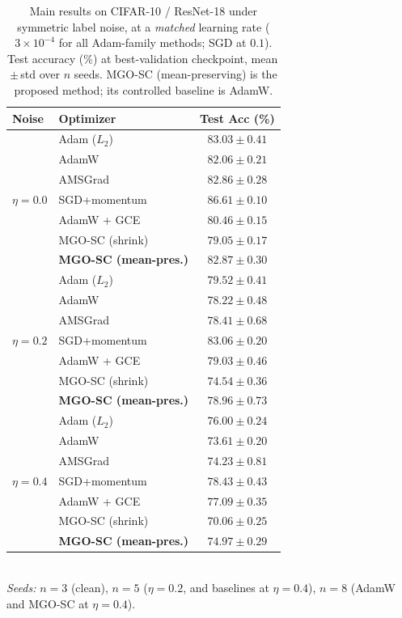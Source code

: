 \begin{table}[!ht]
\centering
\footnotesize
\setlength{\tabcolsep}{5.0pt}
\renewcommand{\arraystretch}{1.15}
\caption{Main results on CIFAR-10 / ResNet-18 under symmetric label noise, at a \emph{matched} learning rate ($3\times10^{-4}$ for all Adam-family methods; SGD at $0.1$). Test accuracy (\%) at best-validation checkpoint, mean\,$\pm$\,std over $n$ seeds. MGO-SC (mean-preserving) is the proposed method; its controlled baseline is AdamW.}
\label{tab:main_results}
\begin{tabular}{llc}
\toprule
\textbf{Noise} & \textbf{Optimizer} & \textbf{Test Acc (\%)} \\
\midrule
\multirow{7}{*}{$\eta=0.0$}
 & Adam ($L_2$)            & $83.03 \pm 0.41$ \\
 & AdamW                   & $82.06 \pm 0.21$ \\
 & AMSGrad                 & $82.86 \pm 0.28$ \\
 & SGD+momentum            & $86.61 \pm 0.10$ \\
 & AdamW + GCE             & $80.46 \pm 0.15$ \\
 & MGO-SC (shrink)         & $79.05 \pm 0.17$ \\
 & \textbf{MGO-SC (mean-pres.)} & $\mathbf{82.87 \pm 0.30}$ \\
\midrule
\multirow{7}{*}{$\eta=0.2$}
 & Adam ($L_2$)            & $79.52 \pm 0.41$ \\
 & AdamW                   & $78.22 \pm 0.48$ \\
 & AMSGrad                 & $78.41 \pm 0.68$ \\
 & SGD+momentum            & $83.06 \pm 0.20$ \\
 & AdamW + GCE             & $79.03 \pm 0.46$ \\
 & MGO-SC (shrink)         & $74.54 \pm 0.36$ \\
 & \textbf{MGO-SC (mean-pres.)} & $\mathbf{78.96 \pm 0.73}$ \\
\midrule
\multirow{7}{*}{$\eta=0.4$}
 & Adam ($L_2$)            & $76.00 \pm 0.24$ \\
 & AdamW                   & $73.61 \pm 0.20$ \\
 & AMSGrad                 & $74.23 \pm 0.81$ \\
 & SGD+momentum            & $78.43 \pm 0.43$ \\
 & AdamW + GCE             & $77.09 \pm 0.35$ \\
 & MGO-SC (shrink)         & $70.06 \pm 0.25$ \\
 & \textbf{MGO-SC (mean-pres.)} & $\mathbf{74.97 \pm 0.29}$ \\
\bottomrule
\end{tabular}
\vspace{2pt}\\
{\footnotesize \textit{Seeds:} $n=3$ (clean), $n=5$ ($\eta=0.2$, and baselines at $\eta=0.4$), $n=8$ (AdamW and MGO-SC at $\eta=0.4$).}
\end{table}
